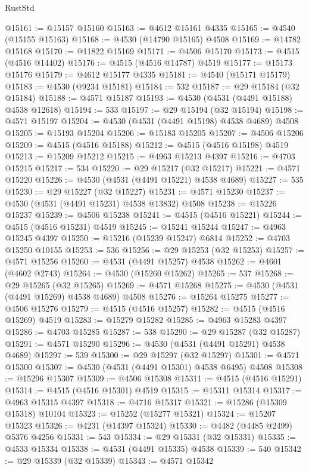 \begin{lexlean}{RustStd}
\begin{coremodule}
{\begin{coremodule}
{{{{{{{{{{{{{{{{{{{{{{{{{{{{{{{{{{{{{{{{{{{{{{{{{{{{{{{@15161 := @15157 @15160
@15163 := @4612 @15161 @4335
@15165 := @4540 (@15155 @15163)
@15168 := @4530 (@14790 @15165) @4508
@15169 := @14782 @15168
@15170 := @11822 @15169
@15171 := @4506 @15170
@15173 := @4515 (@4516 @14402)
@15176 := @4515 (@4516 @14787) @4519
@15177 := @15173 @15176
@15179 := @4612 @15177 @4335
@15181 := @4540 (@15171 @15179)
@15183 := @4530 (@9234 @15181)
@15184 := 532
@15187 := @29 @15184 (@32 @15184)
@15188 := @4571 @15187
@15193 := @4530 (@4531 (@4491 @15188) @4538 @12618)
@15194 := 533
@15197 := @29 @15194 (@32 @15194)
@15198 := @4571 @15197
@15204 := @4530 (@4531 (@4491 @15198) @4538 @4689) @4508
@15205 := @15193 @15204
@15206 := @15183 @15205
@15207 := @4506 @15206
@15209 := @4515 (@4516 @15188)
@15212 := @4515 (@4516 @15198) @4519
@15213 := @15209 @15212
@15215 := @4963 @15213 @4397
@15216 := @4703 @15215
@15217 := 534
@15220 := @29 @15217 (@32 @15217)
@15221 := @4571 @15220
@15226 := @4530 (@4531 (@4491 @15221) @4538 @4689)
@15227 := 535
@15230 := @29 @15227 (@32 @15227)
@15231 := @4571 @15230
@15237 := @4530 (@4531 (@4491 @15231) @4538 @13832) @4508
@15238 := @15226 @15237
@15239 := @4506 @15238
@15241 := @4515 (@4516 @15221)
@15244 := @4515 (@4516 @15231) @4519
@15245 := @15241 @15244
@15247 := @4963 @15245 @4397
@15250 := @15216 (@15239 @15247) @6814
@15252 := @4703 @15250 @10155
@15253 := 536
@15256 := @29 @15253 (@32 @15253)
@15257 := @4571 @15256
@15260 := @4531 (@4491 @15257) @4538
@15262 := @4601 (@4602 @2743)
@15264 := @4530 (@15260 @15262)
@15265 := 537
@15268 := @29 @15265 (@32 @15265)
@15269 := @4571 @15268
@15275 := @4530 (@4531 (@4491 @15269) @4538 @4689) @4508
@15276 := @15264 @15275
@15277 := @4506 @15276
@15279 := @4515 (@4516 @15257)
@15282 := @4515 (@4516 @15269) @4519
@15283 := @15279 @15282
@15285 := @4963 @15283 @4397
@15286 := @4703 @15285
@15287 := 538
@15290 := @29 @15287 (@32 @15287)
@15291 := @4571 @15290
@15296 := @4530 (@4531 (@4491 @15291) @4538 @4689)
@15297 := 539
@15300 := @29 @15297 (@32 @15297)
@15301 := @4571 @15300
@15307 := @4530 (@4531 (@4491 @15301) @4538 @6495) @4508
@15308 := @15296 @15307
@15309 := @4506 @15308
@15311 := @4515 (@4516 @15291)
@15314 := @4515 (@4516 @15301) @4519
@15315 := @15311 @15314
@15317 := @4963 @15315 @4397
@15318 := @4716 @15317
@15321 := @15286 (@15309 @15318) @10104
@15323 := @15252 (@15277 @15321)
@15324 := @15207 @15323
@15326 := @4231 (@14397 @15324)
@15330 := @4482 (@4485 @2499) @5376 @4256
@15331 := 543
@15334 := @29 @15331 (@32 @15331)
@15335 := @4533 @15334
@15338 := @4531 (@4491 @15335) @4538
@15339 := 540
@15342 := @29 @15339 (@32 @15339)
@15343 := @4571 @15342
}}}}}}}}}}}}}}}}}}}}}}}}}}}}}}}}}}}}}}}}}}}}}}}}}}}}}}}
\end{coremodule}}
\end{coremodule}
\end{lexlean}

